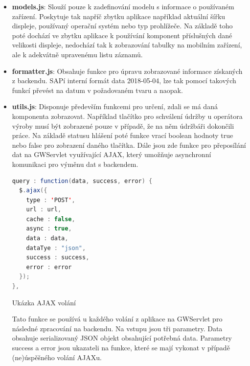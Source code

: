 \documentclass[thesis=M,czech]{FITthesis}[2012/06/26]
\begin{document}
\begin{itemize}
	\begin{itemize}
		\item
		\textbf{models.js}: Slouží pouze k zadefinování modelu s informace o používaném zařízení. Poskytuje tak napříč zbytku aplikace například aktuální šířku displeje, používaný operační systém nebo typ prohlížeče. Na základě toho poté dochází ve zbytku aplikace k používání komponent příslušných dané velikosti displeje, nedochází tak k zobrazování tabulky na mobilním zařízení, ale k adekvátně upravenému listu záznamů.
		\item
		\textbf{formatter.js}: Obsahuje funkce pro úpravu zobrazované informace získaných z backendu. SAPí interní formát data 2018-05-04, lze tak pomocí takových funkcí převést na datum v požadovaném tvaru a naopak.
		\item
		\textbf{utils.js}: \label{file:utils.js} Disponuje především funkcemi pro určení, zdali se má daná komponenta zobrazovat. Například tlačítko pro schválení údržby u operátora výroby musí být zobrazené pouze v případě, že na něm údržbáři dokončili práce. Na základě statusu hlášení poté funkce vrací boolean hodnoty true nebo false pro zobrazení daného tlačítka. Dále jsou zde funkce pro přeposílání dat na GWServlet využívající AJAX, který umožňuje asynchronní komunikaci pro výměnu dat s backendem. 
		\begin{algorithm}[H]
			\begin{lstlisting}[language=java]      
query : function(data, success, error) {
  $.ajax({
    type : 'POST',
    url : url,
    cache : false,
    async : true,
    data : data,
    dataTye : "json",
    success : success,
    error : error
  });
},
			\end{lstlisting}
			\caption{Ukázka AJAX volání}	
			\label{code:ajax}
			\small Tato funkce se používá u každého volání z aplikace na GWServlet pro následné zpracování na backendu. Na vstupu jsou tři parametry. Data obsahuje serializovaný JSON objekt obsahující potřebná data. Parametry success a error jsou ukazateli na funkce, které se mají vykonat v případě (ne)úspěšného volání AJAXu. 
		\end{algorithm}	
		
		
	\end{itemize} 
\end{itemize} 
\end{document}
